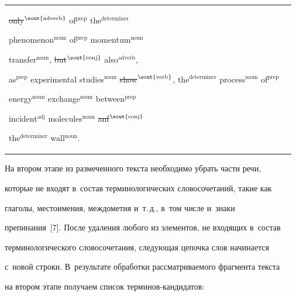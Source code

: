 {\begin{center}
\begin{tabular}{p{72mm}p{50mm}}
\sout{only}$^{\mbox{\scriptsize \sout{adverb}}}$  of$^{\mathrm{prep}}$ the$^{\mathrm{determiner}}$ 


phe\-nom\-e\-non$^{\mathrm{noun}}$ of$^{\mathrm{prep}}$ mo\-men\-tum$^{\mathrm{noun}}$ 


transfer$^{\mathrm{noun}}$,  \sout{but}$^{\mbox{\scriptsize \sout{conj}}}$ also$^{\mathrm{adverb}}$, 


as$^{\mathrm{prep}}$ experimental studies$^{\mathrm{noun}}$ \sout{show}$^{\mbox{\scriptsize 


\sout{verb}}}$, the$^{\mathrm{determiner}}$ process$^{\mathrm{noun}}$ of$^{\mathrm{prep}}$ 


en\-er\-gy$^{\mathrm{noun}}$ exchange$^{\mathrm{noun}}$ be\-tween$^{\mathrm{prep}}$ 


incident$^{\mathrm{adj}}$ mol\-e\-cules$^{\mathrm{noun}}$ \sout{anf}$^{\mbox{\scriptsize \sout{conj}}}$ 


the$^{\mathrm{determiner}}$ wall$^{\mathrm{noun}}$.


\end{tabular}


\end{center}


}








     


     На втором этапе из размеченного текста необходимо убрать части речи, 


которые не входят в~состав терминологических словосочетаний, такие как 


глаголы, местоимения, междометия и~т.\,д., в~том числе и~знаки 


препинания~[7]. После удаления любого из элементов, не входящих в~состав 


терминологического словосочетания, следующая цепочка слов начинается 


с~новой строки. В~результате обработки рассматриваемого фрагмента текста 


на втором этапе получаем список тер\-ми\-нов-кан\-ди\-да\-тов:


